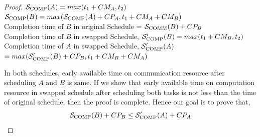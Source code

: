 \documentclass[runningheads]{llncs} %
\newcommand{\scomm}{\ensuremath{{\cal S}_{\text{COMM}}}}
\newcommand{\scomp}{\ensuremath{{\cal S}_{\text{COMP}}}}
\begin{document}
\begin{proof}
	\noindent $\scomp(A) = max(t_1 + CM_A, t_2)$ \\
	\noindent $\scomp(B) = max(\scomp(A) + CP_A,  t_1 + CM_A + CM_B)$\\
	
	\noindent Completion time of $B$ in original Schedule = $\scomm(B) + CP_B$\\
	\noindent Completion time of $B$ in swapped Schedule,  $\scomp '(B)  =  max(t_1 + CM_B, t_2)$\\
	\noindent Completion time of $A$ in swapped Schedule, $ \scomp '(A)$ \newline
	 \hspace*{0pt}\hfill $ = max(\scomp'(B) + CP_B, t_1 + CM_B + CM_A)$
	
	
	\noindent In both schedules, early available time on communication resource after scheduling $A$ and $B$ is same. If we show that early available time on computation resource in swapped schedule after scheduling both tasks is not less than the time of original schedule, then the proof is complete. Hence our goal is to prove that,		
	$$\scomp(B) + CP_B \le \scomp'(A) + CP_A $$
	

\end{proof}
\end{document}

